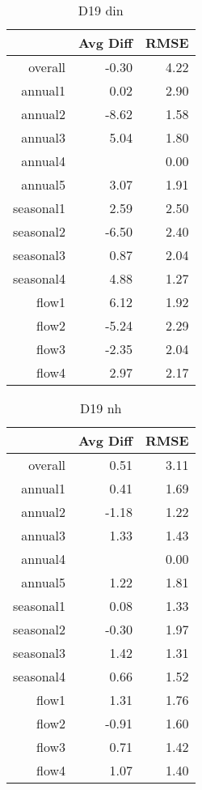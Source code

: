 \begin{table}[H]
\centering
\begin{tabular}{rrr}
  \hline
 & Avg Diff & RMSE \\ 
  \hline
overall & -0.30 & 4.22 \\ 
  annual1 & 0.02 & 2.90 \\ 
  annual2 & -8.62 & 1.58 \\ 
  annual3 & 5.04 & 1.80 \\ 
  annual4 &  & 0.00 \\ 
  annual5 & 3.07 & 1.91 \\ 
  seasonal1 & 2.59 & 2.50 \\ 
  seasonal2 & -6.50 & 2.40 \\ 
  seasonal3 & 0.87 & 2.04 \\ 
  seasonal4 & 4.88 & 1.27 \\ 
  flow1 & 6.12 & 1.92 \\ 
  flow2 & -5.24 & 2.29 \\ 
  flow3 & -2.35 & 2.04 \\ 
  flow4 & 2.97 & 2.17 \\ 
   \hline
\end{tabular}
\caption{D19 din} 
\end{table}
\begin{table}[H]
\centering
\begin{tabular}{rrr}
  \hline
 & Avg Diff & RMSE \\ 
  \hline
overall & 0.51 & 3.11 \\ 
  annual1 & 0.41 & 1.69 \\ 
  annual2 & -1.18 & 1.22 \\ 
  annual3 & 1.33 & 1.43 \\ 
  annual4 &  & 0.00 \\ 
  annual5 & 1.22 & 1.81 \\ 
  seasonal1 & 0.08 & 1.33 \\ 
  seasonal2 & -0.30 & 1.97 \\ 
  seasonal3 & 1.42 & 1.31 \\ 
  seasonal4 & 0.66 & 1.52 \\ 
  flow1 & 1.31 & 1.76 \\ 
  flow2 & -0.91 & 1.60 \\ 
  flow3 & 0.71 & 1.42 \\ 
  flow4 & 1.07 & 1.40 \\ 
   \hline
\end{tabular}
\caption{D19 nh} 
\end{table}
